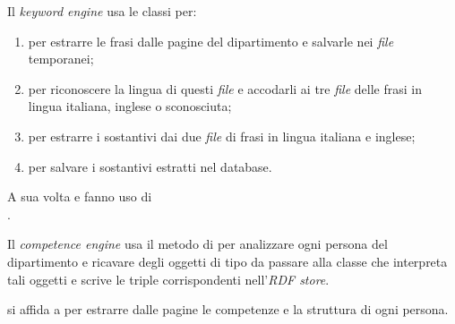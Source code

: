 \documentclass[tesi.tex]{subfiles}
\begin{document}
Il \emph{keyword engine} usa le classi per:
\begin{enumerate}
\item {} per estrarre le frasi dalle pagine del
  dipartimento e salvarle nei \emph{file} temporanei;
\item {} per riconoscere la lingua di questi
  \emph{file} e accodarli ai tre \emph{file} delle frasi in lingua
  italiana, inglese o sconosciuta;
\item {} per estrarre i sostantivi dai due
  \emph{file} di frasi in lingua italiana e inglese;
\item {} per salvare i sostantivi estratti nel
  database.
\end{enumerate}
A sua volta  e  fanno uso di\\
.

Il \emph{competence engine} usa il metodo  di
 per analizzare ogni persona del
dipartimento e ricavare degli oggetti di tipo
 da passare alla classe
 che interpreta tali oggetti e scrive le
triple corrispondenti nell'\emph{RDF store}.

 si affida a 
per estrarre dalle pagine le competenze e la struttura di ogni persona.
\end{document}
